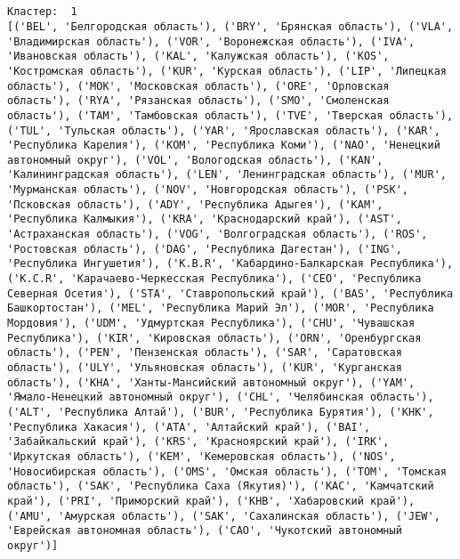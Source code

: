 \documentclass[11pt]{article}
\begin{document}
    \begin{center}
    \end{center}
    { \hspace*{\fill} \\}
    
    \begin{Verbatim}[commandchars=\\\{\}]

Кластер:  1
[('BEL', 'Белгородская область'), ('BRY', 'Брянская область'), ('VLA', 'Владимирская область'), ('VOR', 'Воронежская область'), ('IVA', 'Ивановская область'), ('KAL', 'Калужская область'), ('KOS', 'Костромская область'), ('KUR', 'Курская область'), ('LIP', 'Липецкая область'), ('MOK', 'Московская область'), ('ORE', 'Орловская область'), ('RYA', 'Рязанская область'), ('SMO', 'Смоленская область'), ('TAM', 'Тамбовская область'), ('TVE', 'Тверская область'), ('TUL', 'Тульская область'), ('YAR', 'Ярославская область'), ('KAR', 'Республика Карелия'), ('KOM', 'Республика Коми'), ('NAO', 'Ненецкий автономный округ'), ('VOL', 'Вологодская область'), ('KAN', 'Калинингpадская область'), ('LEN', 'Ленинградская область'), ('MUR', 'Мурманская область'), ('NOV', 'Новгородская область'), ('PSK', 'Псковская область'), ('ADY', 'Республика Адыгея'), ('KAM', 'Республика Калмыкия'), ('KRA', 'Краснодарский край'), ('AST', 'Астраханская область'), ('VOG', 'Волгоградская область'), ('ROS', 'Ростовская область'), ('DAG', 'Республика Дагестан'), ('ING', 'Республика Ингушетия'), ('K.B.R', 'Кабардино-Балкарская Республика'), ('K.C.R', 'Карачаево-Черкесская Республика'), ('CEO', 'Республика Северная Осетия'), ('STA', 'Ставропольский край'), ('BAS', 'Республика Башкортостан'), ('MEL', 'Республика Марий Эл'), ('MOR', 'Республика Мордовия'), ('UDM', 'Удмуртская Республика'), ('CHU', 'Чувашская Республика'), ('KIR', 'Кировская область'), ('ORN', 'Оренбургская область'), ('PEN', 'Пензенская область'), ('SAR', 'Саратовская область'), ('ULY', 'Ульяновская область'), ('KUR', 'Курганская область'), ('KHA', 'Ханты-Мансийский автономный округ'), ('YAM', 'Ямало-Ненецкий автономный округ'), ('CHL', 'Челябинская область'), ('ALT', 'Республика Алтай'), ('BUR', 'Республика Бурятия'), ('KHK', 'Республика Хакасия'), ('ATA', 'Алтайский край'), ('BAI', 'Забайкальский край'), ('KRS', 'Красноярский край'), ('IRK', 'Иркутская область'), ('KEM', 'Кемеровская область'), ('NOS', 'Новосибирская область'), ('OMS', 'Омская область'), ('TOM', 'Томская область'), ('SAK', 'Республика Саха (Якутия)'), ('KAC', 'Камчатский край'), ('PRI', 'Приморский край'), ('KHB', 'Хабаровский край'), ('AMU', 'Амурская область'), ('SAK', 'Сахалинская область'), ('JEW', 'Еврейская автономная область'), ('CAO', 'Чукотский автономный округ')]


\end{Verbatim}
\end{document}
